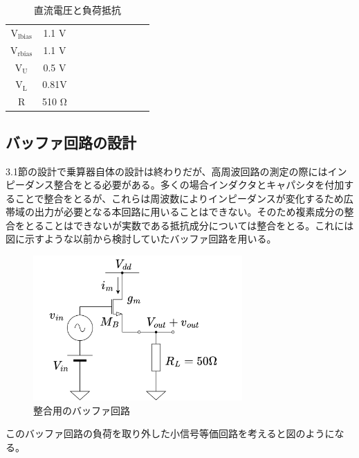 \documentclass[twocolumn]{jsarticle}
\begin{document}
        \begin{table}[H]
        \caption{直流電圧と負荷抵抗}
        \label{table:bias}
        \centering
        \begin{tabular}{c|ccccccccc}
            \\
            $\mathrm{V_{lbias}}$ & 1.1 V\\
            $\mathrm{V_{rbias}}$ & 1.1 V \\
            $\mathrm{V_{U}}$     & 0.5 V  \\
            $\mathrm{V_{L}}$     & 0.81V  \\
            $\mathrm{R}$         & 510 $\mathrm{\Omega}$  
        \end{tabular}
        \end{table}

    \subsection{バッファ回路の設計}
        3.1節の設計で乗算器自体の設計は終わりだが、高周波回路の測定の際にはインピーダンス整合をとる必要がある。多くの場合インダクタとキャパシタを付加することで整合をとるが、これらは周波数によりインピーダンスが変化するため広帯域の出力が必要となる本回路に用いることはできない。そのため複素成分の整合をとることはできないが実数である抵抗成分については整合をとる。これには図に示すような以前から検討していたバッファ回路を用いる。
        \begin{figure}[H]
            \begin{center}
                \includegraphics*[width = 80mm]{figures/resister_buf.png}
                \caption{整合用のバッファ回路}
                \label{fig:buf}
            \end{center}
        \end{figure}
        このバッファ回路の負荷を取り外した小信号等価回路を考えると図のようになる。
\end{document}
